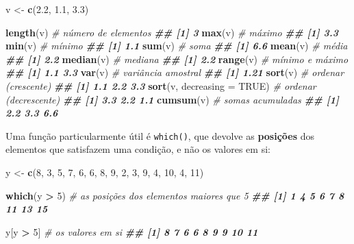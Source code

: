 \documentclass[
  portuguese,
  11pt,
  openany]{book}
\newenvironment{Shaded}{\begin{snugshade}}{\end{snugshade}}
\newcommand{\AttributeTok}[1]{\textcolor[rgb]{0.13,0.29,0.53}{#1}}
\newcommand{\CommentTok}[1]{\textcolor[rgb]{0.56,0.35,0.01}{\textit{#1}}}
\newcommand{\ConstantTok}[1]{\textcolor[rgb]{0.56,0.35,0.01}{#1}}
\newcommand{\DecValTok}[1]{\textcolor[rgb]{0.00,0.00,0.81}{#1}}
\newcommand{\DocumentationTok}[1]{\textcolor[rgb]{0.56,0.35,0.01}{\textbf{\textit{#1}}}}
\newcommand{\FloatTok}[1]{\textcolor[rgb]{0.00,0.00,0.81}{#1}}
\newcommand{\FunctionTok}[1]{\textcolor[rgb]{0.13,0.29,0.53}{\textbf{#1}}}
\newcommand{\NormalTok}[1]{#1}
\newcommand{\OtherTok}[1]{\textcolor[rgb]{0.56,0.35,0.01}{#1}}
\newcommand{\SpecialCharTok}[1]{\textcolor[rgb]{0.81,0.36,0.00}{\textbf{#1}}}
\begin{document}
\begin{Shaded}
\begin{Highlighting}[]
\NormalTok{v }\OtherTok{\textless{}{-}} \FunctionTok{c}\NormalTok{(}\FloatTok{2.2}\NormalTok{, }\FloatTok{1.1}\NormalTok{, }\FloatTok{3.3}\NormalTok{)}

\FunctionTok{length}\NormalTok{(v)     }\CommentTok{\# número de elementos}
\DocumentationTok{\#\# [1] 3}
\FunctionTok{max}\NormalTok{(v)        }\CommentTok{\# máximo}
\DocumentationTok{\#\# [1] 3.3}
\FunctionTok{min}\NormalTok{(v)        }\CommentTok{\# mínimo}
\DocumentationTok{\#\# [1] 1.1}
\FunctionTok{sum}\NormalTok{(v)        }\CommentTok{\# soma}
\DocumentationTok{\#\# [1] 6.6}
\FunctionTok{mean}\NormalTok{(v)       }\CommentTok{\# média}
\DocumentationTok{\#\# [1] 2.2}
\FunctionTok{median}\NormalTok{(v)     }\CommentTok{\# mediana}
\DocumentationTok{\#\# [1] 2.2}
\FunctionTok{range}\NormalTok{(v)      }\CommentTok{\# mínimo e máximo}
\DocumentationTok{\#\# [1] 1.1 3.3}
\FunctionTok{var}\NormalTok{(v)        }\CommentTok{\# variância amostral}
\DocumentationTok{\#\# [1] 1.21}
\FunctionTok{sort}\NormalTok{(v)       }\CommentTok{\# ordenar (crescente)}
\DocumentationTok{\#\# [1] 1.1 2.2 3.3}
\FunctionTok{sort}\NormalTok{(v, }\AttributeTok{decreasing =} \ConstantTok{TRUE}\NormalTok{)   }\CommentTok{\# ordenar (decrescente)}
\DocumentationTok{\#\# [1] 3.3 2.2 1.1}
\FunctionTok{cumsum}\NormalTok{(v)     }\CommentTok{\# somas acumuladas}
\DocumentationTok{\#\# [1] 2.2 3.3 6.6}
\end{Highlighting}
\end{Shaded}

Uma função particularmente útil é \texttt{which()}, que devolve as \textbf{posições} dos elementos que satisfazem uma condição, e não os valores em si:

\begin{Shaded}
\begin{Highlighting}[]
\NormalTok{y }\OtherTok{\textless{}{-}} \FunctionTok{c}\NormalTok{(}\DecValTok{8}\NormalTok{, }\DecValTok{3}\NormalTok{, }\DecValTok{5}\NormalTok{, }\DecValTok{7}\NormalTok{, }\DecValTok{6}\NormalTok{, }\DecValTok{6}\NormalTok{, }\DecValTok{8}\NormalTok{, }\DecValTok{9}\NormalTok{, }\DecValTok{2}\NormalTok{, }\DecValTok{3}\NormalTok{, }\DecValTok{9}\NormalTok{, }\DecValTok{4}\NormalTok{, }\DecValTok{10}\NormalTok{, }\DecValTok{4}\NormalTok{, }\DecValTok{11}\NormalTok{)}

\FunctionTok{which}\NormalTok{(y }\SpecialCharTok{\textgreater{}} \DecValTok{5}\NormalTok{)     }\CommentTok{\# as posições dos elementos maiores que 5}
\DocumentationTok{\#\# [1]  1  4  5  6  7  8 11 13 15}

\NormalTok{y[y }\SpecialCharTok{\textgreater{}} \DecValTok{5}\NormalTok{]         }\CommentTok{\# os valores em si}
\DocumentationTok{\#\# [1]  8  7  6  6  8  9  9 10 11}
\end{Highlighting}
\end{Shaded}
\end{document}
